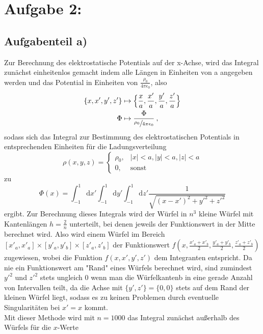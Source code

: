\section*{Aufgabe 2: }

\subsection*{Aufgabenteil a)}
Zur Berechnung des elektrostatische Potentials auf der x-Achse, wird das Integral zunächst einheitenlos
gemacht indem alle Längen in Einheiten von a angegeben werden und das Potential in Einheiten
von $\frac{\rho_0}{4\pi\epsilon_0}$, also
\begin{align}
  \{x,x',y',z'\}&\mapsto \Big\{\frac{x}{a},\frac{x'}{a},\frac{y'}{a},\frac{z'}{a}\Big\} \\
  \Phi &\mapsto \frac{\Phi}{\sfrac{\rho_0}{4\pi\epsilon_0}} \: ,
\end{align}
sodass sich das Integral zur Bestimmung des elektrostatischen Potentials in entsprechenden Einheiten für die Ladungsverteilung
\begin{equation}
  \rho(x,y,z)=
  \begin{cases}
    \rho_0, & \lvert x \rvert < a, \lvert y \rvert < a, \lvert z \rvert < a \\
    0, & \text{sonst}
  \end{cases}
\end{equation}
zu
\begin{equation}
  \Phi(x)=\int_{-1}^{1}\text{d}x'\int_{-1}^{1}\text{d}y'\int_{-1}^{1}\text{d}z'\frac{1}{\sqrt{(x-x')^2+y'^2+z'^2}}
\end{equation}
ergibt.
Zur Berechnung dieses Integrals wird der Würfel in $n^3$ kleine Würfel mit Kantenlängen
$h=\frac{2}{n}$ unterteilt, bei denen jeweils der Funktionswert in der Mitte berechnet wird. Also wird einem Würfel im Bereich $[x'_a,x'_a]\times[y'_a,y'_b] \times[z'_a,z'_b]$ der Funktionswert $f\left(x,\frac{x'_a+x'_b}{2},\frac{y'_a+y'_b}{2},\frac{z'_a+z'_b}{2}\right)$ zugewiesen, wobei die Funktion $f(x,x',y',z')$
dem Integranten entspricht. Da nie ein Funktionswert am "Rand" eines Würfels berechnet wird, sind zumindest
$y'^2$ und $z'^2$ stets ungleich 0 wenn man die Würfelkantenb in eine gerade Anzahl von Intervallen teilt, da die Achse mit $\{y',z'\}=\{0,0\}$ stets auf dem Rand der kleinen Würfel liegt, sodass es zu keinen Problemen durch eventuelle Singularitäten bei $x'=x$ kommt. \\
Mit dieser Methode wird mit $n=1000$ das Integral zunächst außerhalb des Würfels für die $x$-Werte
